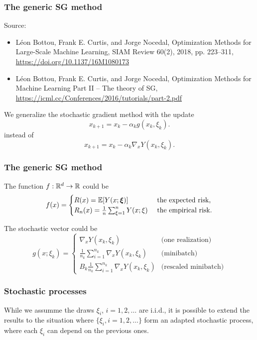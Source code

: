 \documentclass[usepdftitle=false, aspectratio=169]{beamer}
\begin{document}
\begin{frame}
\frametitle{The generic SG method}

Source:
\begin{itemize}
\item 
Léon Bottou, Frank E. Curtis, and Jorge Nocedal, Optimization Methods for Large-Scale Machine Learning, SIAM Review 60(2), 2018, pp. 223--311, \url{https://doi.org/10.1137/16M1080173}
\item
Léon Bottou, Frank E. Curtis, and Jorge Nocedal, Optimization Methods for Machine Learning
Part II – The theory of SG, \url{https://icml.cc/Conferences/2016/tutorials/part-2.pdf}
\end{itemize}

\mbox{}

We generalize the stochastic gradient method with the update
$$
x_{k+1} = x_k - \alpha_k g(x_k, \xi_k).
$$
instead of
$$
x_{k+1} = x_k - \alpha_k \nabla_x Y(x_k, \xi_k).
$$

\end{frame}

\begin{frame}
\frametitle{The generic SG method}

The function $f: {\mathbb{R}}^d \rightarrow {\mathbb{R}}$ could be
$$
f(x) =
\begin{cases}
R(x) = {\mathbb{E}} [ Y(x; {\boldsymbol{\xi}}) ] & \text{ the expected risk,} \\
R_n(x) = \frac{1}{n} \sum_{\xi = 1}^n Y(x; \xi) & \text{ the empirical risk.}
\end{cases}
$$

\mbox{}

The stochastic vector could be
$$
g(x; \xi_k) =
\begin{cases}
\nabla_x Y(x_k, \xi_k) & \text{(one realization)} \\
\frac{1}{n_k} \sum_{i = 1}^{n_k} \nabla_x Y(x_k, \xi_k) & \text{(minibatch)} \\
B_k \frac{1}{n_k} \sum_{i = 1}^{n_k} \nabla_x Y(x_k, \xi_k)
& \text{(rescaled minibatch)}
\end{cases}
$$

\end{frame}

\begin{frame}
\frametitle{Stochastic processes}

While we assumme the draws $\xi_i$, $i = 1,2,\ldots$ are i.i.d., it is possible to extend the results to the situation where $\lbrace \xi_i, i = 1,2,\ldots \rbrace$ form an adapted stochastic process, where each $\xi_i$ can depend on the previous ones.

\end{frame}
\end{document}
